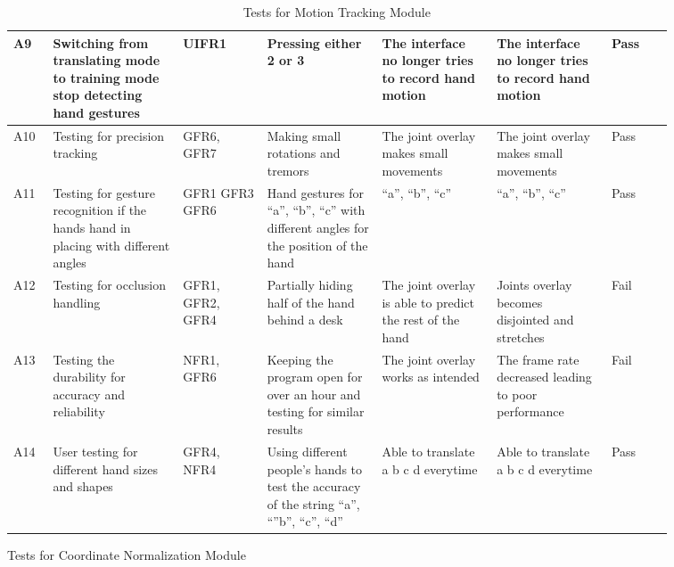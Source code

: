 \documentclass[12pt, titlepage]{article}
\begin{document}
\begin{longtable}{p{0.05\linewidth}|p{0.17\linewidth}|p{0.11\linewidth}|p{0.15\linewidth}|p{0.15\linewidth}|p{0.15\linewidth}|p{0.08\linewidth}}
A9 & Switching from translating mode to training mode stop detecting hand gestures & UIFR1 & Pressing either 2 or 3 & The interface no longer tries to record hand motion & The interface no longer tries to record hand motion & Pass\\ \hline
A10 & Testing for precision tracking & GFR6, GFR7 & Making small rotations and tremors & The joint overlay makes small movements & The joint overlay makes small movements & Pass\\ \hline
A11 & Testing for gesture recognition if the hands hand in placing with different angles & GFR1 GFR3 GFR6 & Hand gestures for “a”, “b”, “c” with different angles for the position of the hand & “a”, “b”, “c” & “a”, “b”, “c” & Pass\\ \hline
A12 & Testing for occlusion handling & GFR1, GFR2, GFR4 & Partially hiding half of the hand behind a desk & The joint overlay is able to predict the rest of the hand & Joints overlay becomes disjointed and stretches & Fail\\ \hline
A13 & Testing the durability for accuracy and reliability & NFR1, GFR6 & Keeping the program open for over an hour and testing for similar results & The joint overlay works as intended & The frame rate decreased leading to poor performance & Fail\\ \hline
A14 & User testing for different hand sizes and shapes & GFR4, NFR4 & Using different people’s hands to test the accuracy of the string “a”, “”b”, “c”, “d” & Able to translate a b c d everytime & Able to translate a b c d everytime & Pass
\hline
\caption{Tests for Motion Tracking Module}
\end{longtable}

\newpage
\centerline{Tests for Coordinate Normalization Module}
\end{document}
